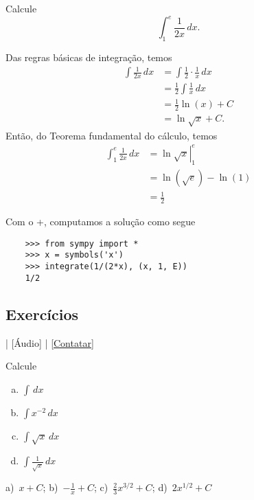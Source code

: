 
\begin{exeresol}
  Calcule
  \begin{equation}
    \int_1^{e} \frac{1}{2x}\,dx.
  \end{equation}
\end{exeresol}
\begin{resol}
  Das regras básicas de integração, temos
  \begin{align}
    \int \frac{1}{2x}\,dx &= \int \frac{1}{2}\cdot\frac{1}{x}\,dx \\
                          &= \frac{1}{2}\int\frac{1}{x}\,dx \\
                          &= \frac{1}{2}\ln(x) + C \\
                          &= \ln\sqrt{x} + C.
  \end{align}
  Então, do Teorema fundamental do cálculo, temos
  \begin{align}
    \int_1^e \frac{1}{2x}\,dx &= \left.\ln\sqrt{x}\right|_1^e\\
                              &= \ln(\sqrt{e}) - \ln(1)\\
                              &= \frac{1}{2}
  \end{align}

  \ifispython
  Com o {\python}+{\sympy}, computamos a solução como segue
  \begin{lstlisting}
    >>> from sympy import *
    >>> x = symbols('x')
    >>> integrate(1/(2*x), (x, 1, E))
    1/2
  \end{lstlisting}
  \fi    
\end{resol}


\subsection{Exercícios}

\begin{flushright}
  [Vídeo] | [Áudio] | \href{https://phkonzen.github.io/notas/contato.html}{[Contatar]}
\end{flushright}

\begin{exer}
  Calcule
  \begin{enumerate}[a)]
  \item $\displaystyle \int \,dx$
  \item $\displaystyle \int x^{-2}\,dx$
  \item $\displaystyle \int \sqrt{x}\,dx$
  \item $\displaystyle \int \frac{1}{\sqrt{x}}\,dx$
  \end{enumerate}
\end{exer}
\begin{resp}
  a)~$\displaystyle x + C$; b)~$\displaystyle -\frac{1}{x} + C$; c)~$\displaystyle \frac{2}{3}x^{3/2} + C$; d)~$\displaystyle 2x^{1/2} + C$
\end{resp}

